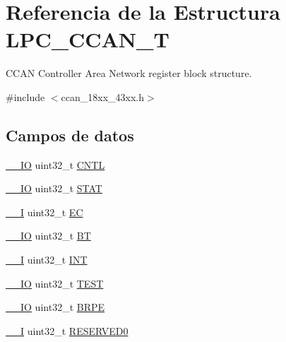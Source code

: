 \hypertarget{struct_l_p_c___c_c_a_n___t}{}\section{Referencia de la Estructura L\+P\+C\+\_\+\+C\+C\+A\+N\+\_\+T}
\label{struct_l_p_c___c_c_a_n___t}


C\+C\+AN Controller Area Network register block structure.  




{\ttfamily \#include $<$ccan\+\_\+18xx\+\_\+43xx.\+h$>$}

\subsection*{Campos de datos}
\begin{DoxyCompactItemize}
\item 
\hyperlink{core__sc300_8h_aec43007d9998a0a0e01faede4133d6be}{\+\_\+\+\_\+\+IO} uint32\+\_\+t \hyperlink{struct_l_p_c___c_c_a_n___t_aaea1cf878c3e7ab37309e673eb50101b}{C\+N\+TL}
\item 
\hyperlink{core__sc300_8h_aec43007d9998a0a0e01faede4133d6be}{\+\_\+\+\_\+\+IO} uint32\+\_\+t \hyperlink{struct_l_p_c___c_c_a_n___t_aa90c98b3b95ed1374dbcf018c74aef79}{S\+T\+AT}
\item 
\hyperlink{core__sc300_8h_af63697ed9952cc71e1225efe205f6cd3}{\+\_\+\+\_\+I} uint32\+\_\+t \hyperlink{struct_l_p_c___c_c_a_n___t_ae9c79ec17ace363c54ee59581274ede5}{EC}
\item 
\hyperlink{core__sc300_8h_aec43007d9998a0a0e01faede4133d6be}{\+\_\+\+\_\+\+IO} uint32\+\_\+t \hyperlink{struct_l_p_c___c_c_a_n___t_a1b9452a1b62004b6e1e81efd18704630}{BT}
\item 
\hyperlink{core__sc300_8h_af63697ed9952cc71e1225efe205f6cd3}{\+\_\+\+\_\+I} uint32\+\_\+t \hyperlink{struct_l_p_c___c_c_a_n___t_a6029b46f9633a968124bfbd9e67992ca}{I\+NT}
\item 
\hyperlink{core__sc300_8h_aec43007d9998a0a0e01faede4133d6be}{\+\_\+\+\_\+\+IO} uint32\+\_\+t \hyperlink{struct_l_p_c___c_c_a_n___t_a071509075a20265b5c09b13d91247a9c}{T\+E\+ST}
\item 
\hyperlink{core__sc300_8h_aec43007d9998a0a0e01faede4133d6be}{\+\_\+\+\_\+\+IO} uint32\+\_\+t \hyperlink{struct_l_p_c___c_c_a_n___t_a36b5bb69b2c273aa0fefe8e0c852d270}{B\+R\+PE}
\item 
\hyperlink{core__sc300_8h_af63697ed9952cc71e1225efe205f6cd3}{\+\_\+\+\_\+I} uint32\+\_\+t \hyperlink{struct_l_p_c___c_c_a_n___t_ad06839c5382047f4f9f2c74cc61db942}{R\+E\+S\+E\+R\+V\+E\+D0}

\end{DoxyCompactItemize}
